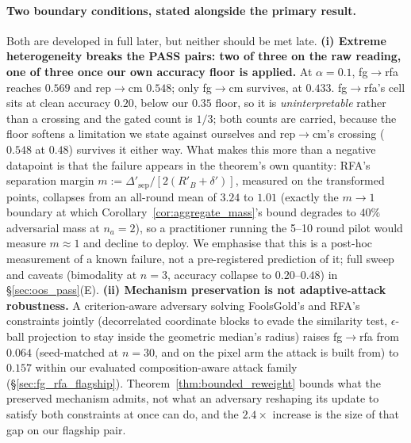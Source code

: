 \documentclass{article}
\begin{document}
\paragraph{Two boundary conditions, stated alongside the primary result.} Both are developed in full later, but neither should be met late. \textbf{(i) Extreme heterogeneity breaks the PASS pairs: two of three on the raw reading, one of three once our own accuracy floor is applied.} At $\alpha{=}0.1$, fg$\to$rfa reaches $0.569$ and rep$\to$cm $0.548$; only fg$\to$cm survives, at $0.433$. fg$\to$rfa's cell sits at clean accuracy $0.20$, below our $0.35$ floor, so it is \emph{uninterpretable} rather than a crossing and the gated count is $1/3$; both counts are carried, because the floor softens a limitation we state against ourselves and rep$\to$cm's crossing ($0.548$ at $0.48$) survives it either way. What makes this more than a negative datapoint is that the failure appears in the theorem's own quantity: RFA's separation margin $m := \Delta'_{\mathrm{sep}}/[2(R'_B+\delta')]$, measured on the transformed points, collapses from an all-round mean of $3.24$ to $1.01$ (exactly the $m \to 1$ boundary at which Corollary~\ref{cor:aggregate_mass}'s bound degrades to $40\%$ adversarial mass at $n_a{=}2$), so a practitioner running the 5--10 round pilot would measure $m \approx 1$ and decline to deploy. We emphasise that this is a post-hoc measurement of a known failure, not a pre-registered prediction of it; full sweep and caveats (bimodality at $n{=}3$, accuracy collapse to $0.20$--$0.48$) in §\ref{sec:oos_pass}(E). \textbf{(ii) Mechanism preservation is not adaptive-attack robustness.} A criterion-aware adversary solving FoolsGold's and RFA's constraints jointly (decorrelated coordinate blocks to evade the similarity test, $\epsilon$-ball projection to stay inside the geometric median's radius) raises fg$\to$rfa from $0.064$ (seed-matched at $n{=}30$, and on the pixel arm the attack is built from) to $0.157$ within our evaluated composition-aware attack family (§\ref{sec:fg_rfa_flagship}). Theorem~\ref{thm:bounded_reweight} bounds what the preserved mechanism admits, not what an adversary reshaping its update to satisfy both constraints at once can do, and the $2.4\times$ increase is the size of that gap on our flagship pair.
\end{document}
